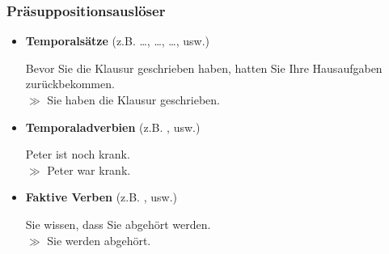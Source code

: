 \begin{frame}
\frametitle{Präsuppositionsauslöser}

\begin{itemize}
	\item \textbf{Temporalsätze} (z.B.  \dots,  \dots,  \dots, usw.)
	
	\ea Bevor Sie die Klausur geschrieben haben, hatten Sie Ihre Hausaufgaben zurückbekommen. \\ $\gg$ Sie haben die Klausur geschrieben.
	\z
	
	\item \textbf{Temporaladverbien} (z.B. , usw.)
	
	\ea Peter ist noch krank.\\ $\gg$ Peter war krank.
	\z
	
	\item \textbf{Faktive Verben} (z.B. , usw.)
	
	\ea Sie wissen, dass Sie abgehört werden.\\ $\gg$ Sie werden abgehört.
	\z

\end{itemize}

\end{frame}

%
%	
%
%		
%		
%		
%
%		
%			
%				
%					
%
%


